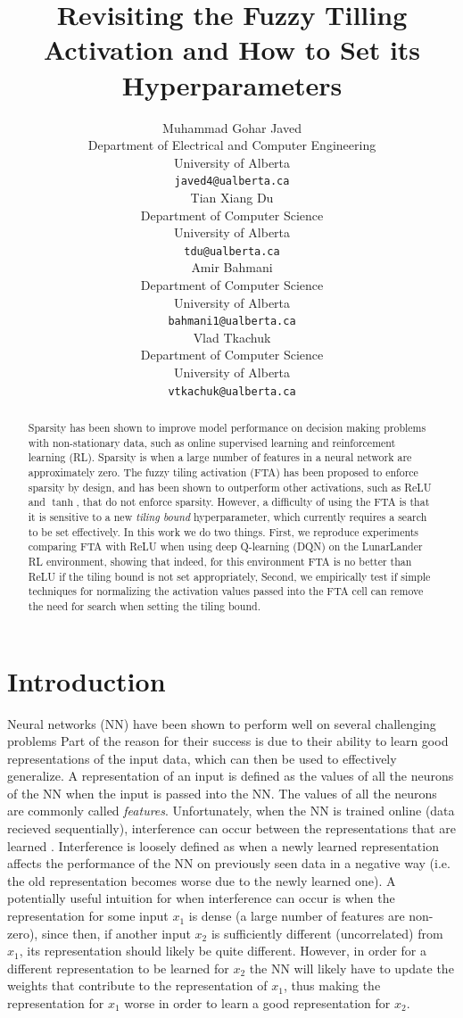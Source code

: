 \documentclass{article}
\title{Revisiting the Fuzzy Tilling Activation and How to Set its Hyperparameters}
\author{%
  Muhammad Gohar Javed \\
  Department of Electrical and Computer Engineering \\
  University of Alberta\\
  \texttt{javed4@ualberta.ca} \\
  \And
  Tian Xiang Du \\
  Department of Computer Science\\
  University of Alberta\\
  \texttt{tdu@ualberta.ca} \\
  \AND
  Amir Bahmani \\
  Department of Computer Science\\
  University of Alberta\\
  \texttt{bahmani1@ualberta.ca} \\
  \And
  Vlad Tkachuk \\
  Department of Computer Science\\
  University of Alberta\\
  \texttt{vtkachuk@ualberta.ca} \\
}
\begin{document}
\maketitle


\begin{abstract}
  Sparsity has been shown to improve model performance on decision making problems with non-stationary data, such as online supervised learning and reinforcement learning (RL).
  Sparsity is when a large number of features in a neural network are approximately zero.
  The fuzzy tiling activation (FTA) has been proposed to enforce sparsity by design, and has been shown to outperform other activations, such as ReLU and $\tanh$, that do not enforce sparsity.
  However, a difficulty of using the FTA is that it is sensitive to a new \textit{tiling bound} hyperparameter, which currently requires a search to be set effectively.
  In this work we do two things. 
  First, we reproduce experiments comparing FTA with ReLU when using deep Q-learning (DQN) on the LunarLander RL environment, showing that indeed, for this environment FTA is no better than ReLU if the tiling bound is not set appropriately,
  Second, we empirically test if simple techniques for normalizing the activation values passed into the FTA cell can remove the need for search when setting the tiling bound.


\end{abstract}


\section{Introduction} \label{sec:intro}
Neural networks (NN) have been shown to perform well on several challenging problems \cite{brown2020language,krizhevsky2017imagenet,mnih2013playing,silver2017mastering} 
Part of the reason for their success is due to their ability to learn good representations of the input data, which can then be used to effectively generalize.
A representation of an input is defined as the values of all the neurons of the NN when the input is passed into the NN.
The values of all the neurons are commonly called \textit{features}.  
Unfortunately, when the NN is trained online (data recieved sequentially), interference can occur between the representations that are learned \cite[]{chandak2019learning,caselles2018continual,madjiheurem2019representation}.
Interference is loosely defined as when a newly learned representation affects the performance of the NN on previously seen data in a negative way (i.e. the old representation becomes worse due to the newly learned one).
A potentially useful intuition for when interference can occur is when the representation for some input $x_1$ is dense (a large number of features are non-zero), 
since then, if another input $x_2$ is sufficiently different (uncorrelated) from $x_1$, its representation should likely be quite different.
However, in order for a different representation to be learned for $x_2$ the NN will likely have to update the weights that contribute to the representation of $x_1$, 
thus making the representation for $x_1$ worse in order to learn a good representation for $x_2$.
\end{document}
